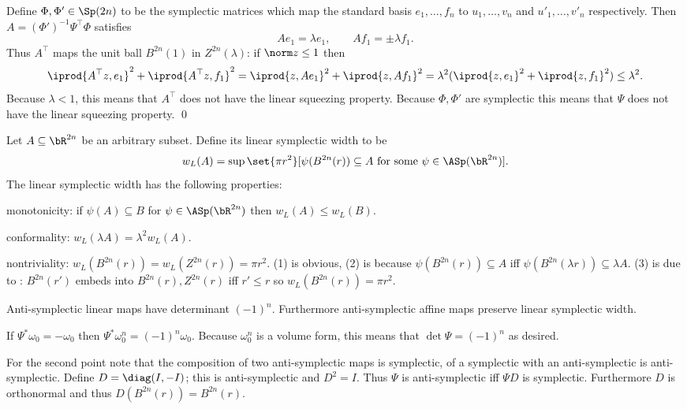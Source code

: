     Define $\Phi,\Phi'\in\Sp(2n)$ to be the symplectic matrices which map the standard basis $e_1,\dots,f_n$ to $u_1,\dots,v_n$ and $u'_1,\dots,v'_n$ respectively.
    Then $A=(\Phi')^{-1}\Psi^\top\Phi$ satisfies
    $$ Ae_1 = \lambda e_1,\qquad Af_1 = \pm\lambda f_1 . $$
    Thus $A^\top$ maps the unit ball $B^{2n}(1)$ in $Z^{2n}(\lambda)$: if $\norm z\leq1$ then
    $$ \iprod{A^\top z,e_1}^2 + \iprod{A^\top z,f_1}^2 = \iprod{z,Ae_1}^2 + \iprod{z,Af_1}^2 = \lambda^2(\iprod{z,e_1}^2 + \iprod{z,f_1}^2) \leq \lambda^2 . $$
    Because $\lambda<1$, this means that $A^\top$ does not have the linear squeezing property.
    Because $\Phi,\Phi'$ are symplectic this means that $\Psi$ does not have the linear squeezing property.
    \qed

\eproof

Let $A\subseteq\bR^{2n}$ be an arbitrary subset.
Define its {\emphcolor linear symplectic width} to be
$$ w_L(A) = \sup\set{\pi r^2}[\psi(B^{2n}(r))\subseteq A\hbox{ for some $\psi\in\ASp(\bR^{2n})$}] . $$
The linear symplectic width has the following properties:
\benum
    \item {\emphcolor monotonicity}: if $\psi(A)\subseteq B$ for $\psi\in\ASp(\bR^{2n})$ then $w_L(A)\leq w_L(B)$.
    \item {\emphcolor conformality}: $w_L(\lambda A)=\lambda^2w_L(A)$.
    \item {\emphcolor nontriviality}: $w_L(B^{2n}(r))=w_L(Z^{2n}(r))=\pi r^2$.
\eenum
(1) is obvious, (2) is because $\psi(B^{2n}(r))\subseteq A$ iff $\psi(B^{2n}(\lambda r))\subseteq\lambda A$.
(3) is due to : $B^{2n}(r')$ embeds into $B^{2n}(r),Z^{2n}(r)$ iff $r'\leq r$ so $w_L(B^{2n}(r))=\pi r^2$.

\blemm

    Anti-symplectic linear maps have determinant $(-1)^n$.
    Furthermore anti-symplectic affine maps preserve linear symplectic width.

\elemm

\bproof

    If $\Psi^*\omega_0=-\omega_0$ then $\Psi^*\omega_0^n=(-1)^n\omega_0$.
    Because $\omega_0^n$ is a volume form, this means that $\det\Psi=(-1)^n$ as desired.

    For the second point note that the composition of two anti-symplectic maps is symplectic, of a symplectic with an anti-symplectic is anti-symplectic.
    Define $D=\diag(I,-I)$; this is anti-symplectic and $D^2=I$.
    Thus $\Psi$ is anti-symplectic iff $\Psi D$ is symplectic.
    Furthermore $D$ is orthonormal and thus $D(B^{2n}(r))=B^{2n}(r)$.

